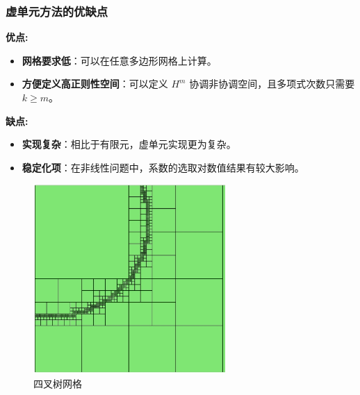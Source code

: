 \documentclass[notheorems,serif]{beamer}
\begin{document}
\begin{frame}
    \frametitle{虚单元方法的优缺点}
\begin{minipage}[b]{0.6\linewidth}
\textbf{优点:}
\begin{itemize}
    \item \textbf{网格要求低}：可以在任意多边形网格上计算。
    \item \textbf{方便定义高正则性空间}：可以定义 $H^m$
        协调非协调空间，且多项式次数只需要 $k \geq m$。
\end{itemize}
\vspace{10pt}
\textbf{缺点:}
\begin{itemize}
    \item \textbf{实现复杂}：相比于有限元，虚单元实现更为复杂。 
    \item \textbf{稳定化项}：在非线性问题中，系数的选取对数值结果有较大影响。
\end{itemize}
\end{minipage}
\hfill
\begin{minipage}[b]{0.38\linewidth}
    \centering
    \begin{figure}[htpb]
        \centering
        \includegraphics[width=0.65\textwidth]{../figures/four.jpg}
        \caption{四叉树网格}
    \end{figure}
\end{minipage}
\end{frame}
\end{document}
